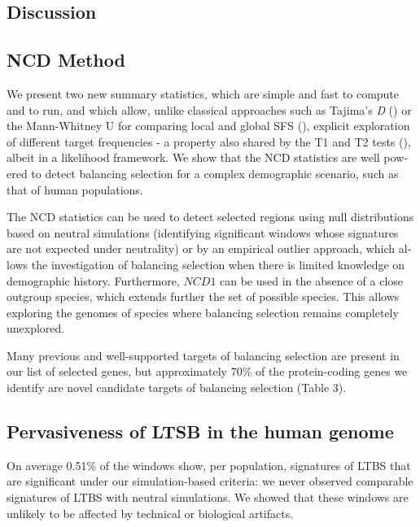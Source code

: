 \begin{refsection}
\begin{otherlanguage}{english}
\afterpage{\FloatBarrier}

\newpage
\section{Discussion}

\subsection{NCD Method}

We present two new summary statistics, which are simple and fast to compute and to run, and which allow, unlike classical approaches such as Tajima’s \emph{D} (\cite{tajima1989statistical}) or the Mann-Whitney U for comparing local and global SFS (\cite{Andres2009,Nielsen2009}), explicit exploration of different target frequencies - a property also shared by the T1 and T2 tests (\cite{DeGiorgio2014}), albeit in a likelihood framework. We show that the NCD statistics are well powered to detect balancing selection for a complex demographic scenario, such as that of human populations.

The NCD statistics can be used to detect selected regions using null distributions based on neutral simulations (identifying significant windows whose signatures are not expected under neutrality) or by an empirical outlier approach, which allows the investigation of balancing selection when there is limited knowledge on demographic history. Furthermore, $NCD1$ can be used in the absence of a close outgroup species, which extends further the set of possible species. This allows exploring the genomes of species where balancing selection remains completely unexplored.

Many previous and well-supported targets of balancing selection are present in our list of selected genes, but approximately 70\% of the protein-coding genes we identify are novel candidate targets of balancing selection (Table 3). 


\subsection{Pervasiveness of LTSB in the human genome}
On average 0.51\% of the windows show, per population, signatures of LTBS that are significant under our simulation-based criteria: we never observed comparable signatures of LTBS with neutral simulations. We showed that these windows are unlikely to be affected by technical or biological artifacts. 


\end{otherlanguage}
\end{refsection}
